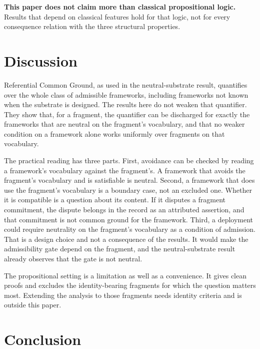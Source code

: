 \documentclass[11pt]{article}
\theoremstyle{plain}
\theoremstyle{definition}
\theoremstyle{remark}
\begin{document}
\textbf{This paper does not claim more than classical propositional logic.}
Results that depend on classical features hold for that logic, not for every
consequence relation with the three structural properties.

\section{Discussion}
\label{sec:discussion}

Referential Common Ground, as used in the neutral-substrate result, quantifies
over the whole class of admissible frameworks, including frameworks not known
when the substrate is designed.
The results here do not weaken that quantifier.
They show that, for a fragment, the quantifier can be discharged for exactly
the frameworks that are neutral on the fragment's vocabulary, and that no weaker
condition on a framework alone works uniformly over fragments on that
vocabulary.

The practical reading has three parts.
First, avoidance can be checked by reading a framework's vocabulary against the
fragment's.
A framework that avoids the fragment's vocabulary and is satisfiable is neutral.
Second, a framework that does use the fragment's vocabulary is a boundary case,
not an excluded one.
Whether it is compatible is a question about its content.
If it disputes a fragment commitment, the dispute belongs in the record as an
attributed assertion, and that commitment is not common ground for the
framework.
Third, a deployment could require neutrality on the fragment's vocabulary as a
condition of admission.
That is a design choice and not a consequence of the results.
It would make the admissibility gate depend on the fragment, and the
neutral-substrate result already observes that the gate is not neutral.

The propositional setting is a limitation as well as a convenience.
It gives clean proofs and excludes the identity-bearing fragments for which the
question matters most.
Extending the analysis to those fragments needs identity criteria and is
outside this paper.


\section{Conclusion}
\label{sec:conclusion}
\end{document}
